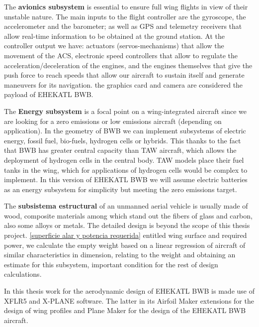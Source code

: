 The \textbf{avionics subsystem} is essential to ensure full wing flights in view of their unstable nature.
%
The main inputs to the flight controller are the gyroscope, the accelerometer and the barometer; as well as GPS and telemetry receivers that allow real-time information to be obtained at the ground station. At the controller output we have: actuators (servos-mechanisms) that allow the movement of the ACS, electronic speed controllers that allow to regulate the acceleration/deceleration of the engines, and the engines themselves that give the push force to reach speeds that allow our aircraft to sustain itself and generate maneuvers for its navigation. 
%
the graphics card and camera are considered the payload of EHEKATL BWB.

The \textbf{Energy subsystem} is a focal point on a wing-integrated aircraft since we are looking for a zero emissions or low emissions aircraft (depending on application).
%
In the geometry of BWB we can implement subsystems of electric energy, fossil fuel, bio-fuels, hydrogen cells or hybrids. This thanks to the fact that BWB has greater central capacity than TAW aircraft, which allows the deployment of hydrogen cells in the central body. TAW models place their fuel tanks in the wing, which for applications of hydrogen cells would be complex to implement.
%
In this version of EHEKATL BWB we will assume electric batteries as an energy subsystem for simplicity but meeting the zero emissions target.

The \textbf{subsistema estructural} of an unmanned aerial vehicle is usually made of wood, composite materials among which stand out the fibers of glass and carbon, also some alloys or metals. The detailed design is beyond the scope of this thesis project. \ref{superficie alar y potencia requerida} entitled wing surface and required power, we calculate the empty weight based on a linear regression of aircraft of similar characteristics in dimension, relating to the weight and obtaining an estimate for this subsystem, important condition for the rest of design calculations. 


In this thesis work for the aerodynamic design of EHEKATL BWB is made use of XFLR5 and X-PLANE software. The latter in its Airfoil Maker extensions for the design of wing profiles and Plane Maker for the design of the EHEKATL BWB aircraft. 

\bigskip
